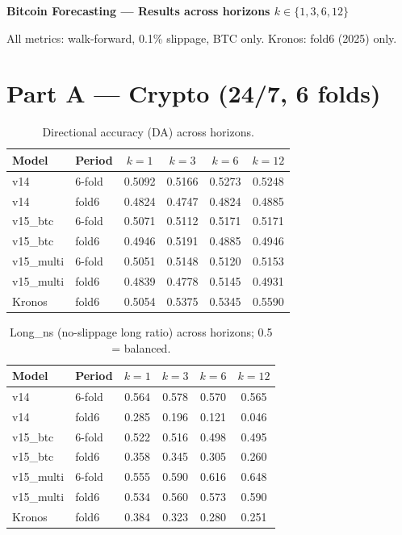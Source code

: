 \documentclass[11pt]{article}
\begin{document}
\begin{center}{\Large\textbf{Bitcoin Forecasting --- Results across horizons $k\in\{1,3,6,12\}$}}\end{center}
\medskip All metrics: walk-forward, 0.1\% slippage, BTC only. Kronos: fold6 (2025) only.
\section*{Part A --- Crypto (24/7, 6 folds)}
\begin{table}[h]\centering
\caption{Directional accuracy (DA) across horizons.}
\label{tab:da}
\begin{tabular}{ll cccc}
\toprule
Model & Period & $k{=}1$ & $k{=}3$ & $k{=}6$ & $k{=}12$ \\
\midrule
v14 & 6-fold & 0.5092 & 0.5166 & 0.5273 & 0.5248 \\
v14 & fold6 & 0.4824 & 0.4747 & 0.4824 & 0.4885 \\
v15\_btc & 6-fold & 0.5071 & 0.5112 & 0.5171 & 0.5171 \\
v15\_btc & fold6 & 0.4946 & 0.5191 & 0.4885 & 0.4946 \\
v15\_multi & 6-fold & 0.5051 & 0.5148 & 0.5120 & 0.5153 \\
v15\_multi & fold6 & 0.4839 & 0.4778 & 0.5145 & 0.4931 \\
Kronos & fold6 & 0.5054 & 0.5375 & 0.5345 & 0.5590 \\
\bottomrule\end{tabular}\end{table}
\begin{table}[h]\centering
\caption{Long\_ns (no-slippage long ratio) across horizons; 0.5 = balanced.}
\label{tab:lns}
\begin{tabular}{ll cccc}
\toprule
Model & Period & $k{=}1$ & $k{=}3$ & $k{=}6$ & $k{=}12$ \\
\midrule
v14 & 6-fold & 0.564 & 0.578 & 0.570 & 0.565 \\
v14 & fold6 & 0.285 & 0.196 & 0.121 & 0.046 \\
v15\_btc & 6-fold & 0.522 & 0.516 & 0.498 & 0.495 \\
v15\_btc & fold6 & 0.358 & 0.345 & 0.305 & 0.260 \\
v15\_multi & 6-fold & 0.555 & 0.590 & 0.616 & 0.648 \\
v15\_multi & fold6 & 0.534 & 0.560 & 0.573 & 0.590 \\
Kronos & fold6 & 0.384 & 0.323 & 0.280 & 0.251 \\
\bottomrule\end{tabular}\end{table}
\end{document}
